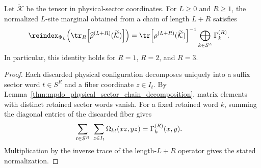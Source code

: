 \begin{lemma}
    \label{thm:mpdo_suffix_marginal_block_expansion}
    \leanok
    Let $\widetilde{\mathcal K}$ be the tensor in physical-sector
    coordinates. For $L\geq0$ and $R\geq1$, the normalized $L$-site
    marginal obtained from a chain of length $L+R$ satisfies
    \begin{align}
        \reindex_{\Phi_L}\!
        \left(
        \tr_R\!\left[\widehat\rho^{(L+R)}
            (\widetilde{\mathcal K})\right]
        \right)
         & =
        \tr\!\left[\rho^{(L+R)}
            (\widetilde{\mathcal K})\right]^{-1}
        \bigoplus_{k\in S^L}\Gamma_k^{(R)}.
        \notag
    \end{align}
    In particular, this identity holds for $R=1$, $R=2$, and $R=3$.
\end{lemma}

\begin{proof}\leanok
    Each discarded physical configuration decomposes uniquely into a suffix
    sector word $t\in S^R$ and a fiber coordinate $z\in I_t$. By
    Lemma~\ref{thm:mpdo_physical_sector_chain_decomposition}, matrix
    elements with distinct retained sector words vanish. For a fixed
    retained word $k$, summing the diagonal entries of the discarded fiber
    gives
    \begin{align}
        \sum_{t\in S^R}\ \sum_{z\in I_t}
        \Omega_{kt}(xz,yz)
         & =\Gamma_k^{(R)}(x,y).
        \notag
    \end{align}
    Multiplication by the inverse trace of the length-$L+R$ operator gives
    the stated normalization.
\end{proof}

